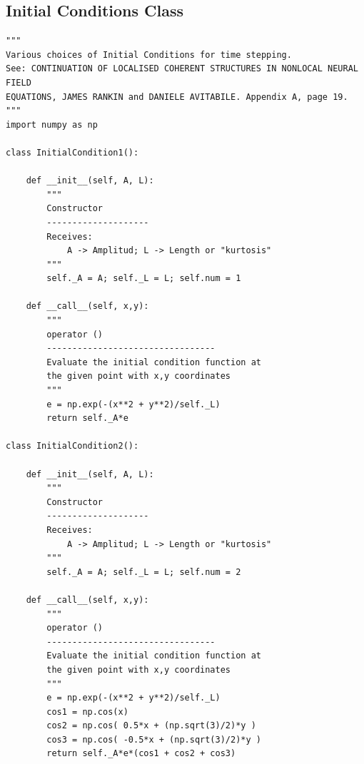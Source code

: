 \documentclass{uonmathreport}
\begin{document}
\subsection{Initial Conditions Class} \label{app:initial_conditions}
\begin{verbatim}
"""
Various choices of Initial Conditions for time stepping.
See: CONTINUATION OF LOCALISED COHERENT STRUCTURES IN NONLOCAL NEURAL FIELD 
EQUATIONS, JAMES RANKIN and DANIELE AVITABILE. Appendix A, page 19.
"""
import numpy as np
	
class InitialCondition1():
	
	def __init__(self, A, L):
		"""
		Constructor
		--------------------
		Receives:
			A -> Amplitud; L -> Length or "kurtosis"
		"""
		self._A = A; self._L = L; self.num = 1
	
	def __call__(self, x,y):
		"""
		operator ()
		---------------------------------
		Evaluate the initial condition function at
		the given point with x,y coordinates
		"""
		e = np.exp(-(x**2 + y**2)/self._L)
		return self._A*e
	
class InitialCondition2():
	
	def __init__(self, A, L):
		"""
		Constructor
		--------------------
		Receives:
			A -> Amplitud; L -> Length or "kurtosis"
		"""
		self._A = A; self._L = L; self.num = 2
	
	def __call__(self, x,y):
		"""
		operator ()
		---------------------------------
		Evaluate the initial condition function at
		the given point with x,y coordinates
		"""
		e = np.exp(-(x**2 + y**2)/self._L)
		cos1 = np.cos(x)
		cos2 = np.cos( 0.5*x + (np.sqrt(3)/2)*y )
		cos3 = np.cos( -0.5*x + (np.sqrt(3)/2)*y )
		return self._A*e*(cos1 + cos2 + cos3)
\end{verbatim}
\end{document}

